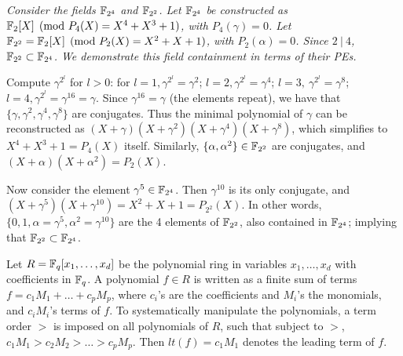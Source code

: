 \begin{Example}
{\it
Consider the fields ${\mathbb{F}}_{2^4}$ and ${\mathbb{F}}_{2^2}$. Let ${\mathbb{F}}_{2^4}$ be
constructed as ${\mathbb{F}}_2[X] \pmod{ P_4(X)=X^4+X^3+1}$, with $P_4(\gamma)=0$. 
Let ${\mathbb{F}}_{2^2} = {\mathbb{F}}_2[X]\pmod{
  P_2(X)=X^2+X+1}$, with $P_2(\alpha)=0$. Since $2 ~|~ 4$, ${\mathbb{F}}_{2^2}
\subset {\mathbb{F}}_{2^4}$. We demonstrate this field containment in terms of
their PEs. 

Compute $\gamma^{2^l}$ for $l>0$: for
$l=1,\gamma^{2^l}=\gamma^2$; $l=2,\gamma^{2^l}=\gamma^4$; $l=3,
~\gamma^{2^l}=\gamma^8$; $l=4, \gamma^{2^l}=\gamma^{16}=\gamma$. Since
$\gamma^{16}=\gamma$ (the elements repeat), we have that $\{\gamma,
\gamma^2, \gamma^4, \gamma^8\}$ are conjugates. Thus the minimal
polynomial of $\gamma$ can be reconstructed as
$(X+\gamma)(X+\gamma^2)(X+\gamma^4)(X+\gamma^8)$, which simplifies to
$X^4+X^3+1 = P_4(X)$
itself. Similarly, $\{\alpha,\alpha^2\}\in {\mathbb{F}}_{2^2}$ are conjugates, and
$(X+\alpha)(X+\alpha^2)=P_2(X)$.

Now consider the element $\gamma^5 \in {\mathbb{F}}_{2^4}$. Then $\gamma^{10}$
is its only conjugate, and $(X+\gamma^5)(X+\gamma^{10}) =
X^2+X+1=P_{2^2}(X)$. In other words, $\{0, 1, \alpha = \gamma^5, \alpha^2 =
\gamma^{10}\}$ are the 4 elements of ${\mathbb{F}}_{2^2}$, also contained in
${\mathbb{F}}_{2^4}$; implying that ${\mathbb{F}}_{2^2} \subset {\mathbb{F}}_{2^4}$.
}
\end{Example}

Let $R={\mathbb{F}}_q[x_1,\dots,x_d]$ be the  polynomial ring in variables
$x_1,\dots,x_d$ with coefficients in ${\mathbb{F}}_q$. A polynomial $f \in R$ is 
written as a finite sum of terms  $f = c_1 M_1 +  \dots +
c_p M_p$, where $c_i$'s are the coefficients and $M_i$'s
the monomials, and $c_i M_i$'s terms of $f$.
To systematically manipulate the polynomials, a term order $>$
is imposed on all polynomials of $R$, such that subject to $>$,
$c_1M_1 > c_2 M_2 > \dots > c_p M_p$. Then $lt(f) = c_1 M_1$ denotes
the leading term of $f$. 

